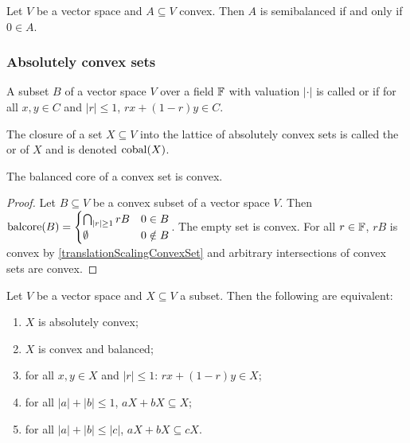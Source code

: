 \begin{lemma} \label{convexSemibalanced}
Let $V$ be a vector space and $A\subseteq V$ convex. Then $A$ is semibalanced \textup{if and only if} $0\in A$.
\end{lemma}

\subsubsection{Absolutely convex sets}
\begin{definition}
A subset $B$ of a vector space $V$ over a field $\mathbb{F}$ with valuation $|\cdot|$ is called  or  if for all $x,y\in C$ and $|r| \leq 1$, $rx + (1-r)y\in C$.

The closure of a set $X\subseteq V$ into the lattice of absolutely convex sets is called the  or  of $X$ and is denoted $\operatorname{cobal}(X)$.
\end{definition}

\begin{lemma} \label{balancedCoreConvexSet}
The balanced core of a convex set is convex.
\end{lemma}
\begin{proof}
Let $B\subseteq V$ be a convex subset of a vector space $V$. Then
$\operatorname{balcore}(B) = \begin{cases}
\bigcap_{|r|\geq 1}rB & 0\in B\\
\emptyset & 0\notin B
\end{cases}$. The empty set is convex. For all $r\in \mathbb{F}$, $rB$ is convex by \ref{translationScalingConvexSet} and arbitrary intersections of convex sets are convex.
\end{proof}

\begin{lemma} \label{absolutelyConvexCriteria}
Let $V$ be a vector space and $X\subseteq V$ a subset. Then the following are equivalent:
\begin{enumerate}
\item $X$ is absolutely convex;
\item $X$ is convex and balanced;
\item for all $x,y\in X$ and $|r| \leq 1$:  $rx + (1-r)y\in X$;
\item for all $|a|+|b| \leq 1$, $aX +bX \subseteq X$;
\item for all $|a|+|b| \leq |c|$, $aX +bX \subseteq cX$.
\end{enumerate}
\end{lemma}

